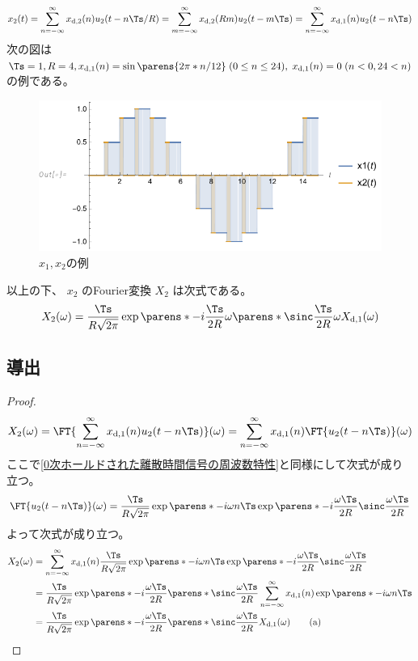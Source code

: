             \[ x_2(t) = \sum_{n=-\infty}^\infty \xdb(n)u_2(t-n\Ts/R) = \sum_{m=-\infty}^\infty \xdb(R m)u_2(t-m\Ts) = \sum_{n=-\infty}^\infty \xda(n)u_2(t-n\Ts) \]
            次の図は $\Ts=1,R=4,\xda(n) = \sin\parens{2\pi*n/12}\;(0\leq n\leq 24),\;\xda(n) = 0\;(n<0,24<n)$ の例である。
            \begin{figure}[H]
                \centering
                \includegraphics[keepaspectratio, scale=0.8]
                {parts/time-discretization/chapters/up-sampling/imgs/x1,x2.pdf}
                \caption{$x_1,x_2$の例}
                \label{アップサンプリング前後のDAC出力の例}
            \end{figure}
            以上の下、 $x_2$ のFourier変換 $X_2$ は次式である。
            \[ X_2(\omega) = \frac{\Ts}{R\sqrt{2\pi}}\exp\parens*{-i\frac{\Ts}{2R}\omega}\parens*{\sinc \frac{\Ts}{2R}\omega}\Xda(\omega) \]
        \subsection{導出}
            \begin{proof}
                \quad\par
                \[ X_2(\omega) = \FT{\sum_{n=-\infty}^\infty \xda(n)u_2(t-n\Ts)}(\omega) = \sum_{n=-\infty}^\infty \xda(n)\FT{u_2(t-n\Ts)}(\omega) \]
                ここで\ref{0次ホールドされた離散時間信号の周波数特性}と同様にして次式が成り立つ。
                \[ \FT{u_2(t-n\Ts)}(\omega) = \frac{\Ts}{R\sqrt{2\pi}}\exp\parens*{-i \omega n\Ts}\exp\parens*{-i\frac{\omega\Ts}{2R}}\sinc\frac{\omega\Ts}{2R} \]
                よって次式が成り立つ。
                \begin{align*}
                    X_2(\omega) &= \sum_{n=-\infty}^\infty \xda(n)\frac{\Ts}{R\sqrt{2\pi}}\exp\parens*{-i \omega n\Ts}\exp\parens*{-i\frac{\omega\Ts}{2R}}\sinc\frac{\omega\Ts}{2R} \\
                    &= \frac{\Ts}{R\sqrt{2\pi}}\exp\parens*{-i\frac{\omega\Ts}{2R}}\parens*{\sinc\frac{\omega\Ts}{2R}} \sum_{n=-\infty}^\infty \xda(n)\exp\parens*{-i \omega n\Ts} \\
                    &= \frac{\Ts}{R\sqrt{2\pi}}\exp\parens*{-i\frac{\omega\Ts}{2R}}\parens*{\sinc\frac{\omega\Ts}{2R}} \Xda(\omega) \tag{a}
                \end{align*}
            \end{proof}
